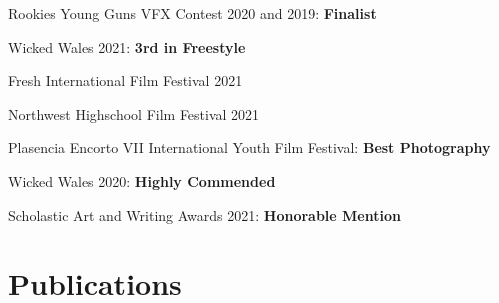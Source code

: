 \documentclass[]{deedy-long-resume}
\begin{document}
\begin{paracol}{2}
\begin{tightemize}
\item Rookies Young Guns VFX Contest 2020 and 2019: \textbf{Finalist}
\end{tightemize}
\sectionsep

\sectionsep

\begin{tightemize}
\item Wicked Wales 2021: \textbf{3rd in Freestyle}
\item Fresh International Film Festival 2021
\item Northwest Highschool Film Festival 2021
\end{tightemize}
\sectionsep

\begin{tightemize}
\item Plasencia Encorto VII International Youth Film Festival: \textbf{Best Photography}
\item Wicked Wales 2020: \textbf{Highly Commended}
\item Scholastic Art and Writing Awards 2021: \textbf{Honorable Mention}
\end{tightemize}
\sectionsep


\section{Publications} 
\nocite{*}
\printbibliography[heading=none]

\end{paracol}
\renewcommand{\thefootnote}{\fnsymbol{footnote}}
\end{document}
